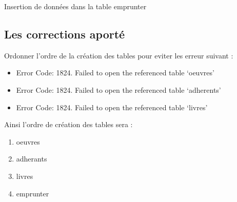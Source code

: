 \documentclass{article}
\begin{document}
\newpage
\begin{listing}[H]
\inputminted{mysql}{code/insert_emprunter.sql}
\caption{Insertion de données dans la table emprunter}
\end{listing}

\subsection{Les corrections aporté}
    Ordonner l'ordre de la création des tables pour eviter les erreur
    suivant :
    
\begin{itemize}
    \item Error Code: 1824. Failed to open the referenced table `oeuvres'
    \item Error Code: 1824. Failed to open the referenced table `adherents'
    \item Error Code: 1824. Failed to open the referenced table `livres'
\end{itemize}


Ainsi l'ordre de création des tables sera :
\begin{enumerate}
    \item oeuvres
    \item adherants
    \item livres
    \item emprunter
\end{enumerate}
\end{document}
